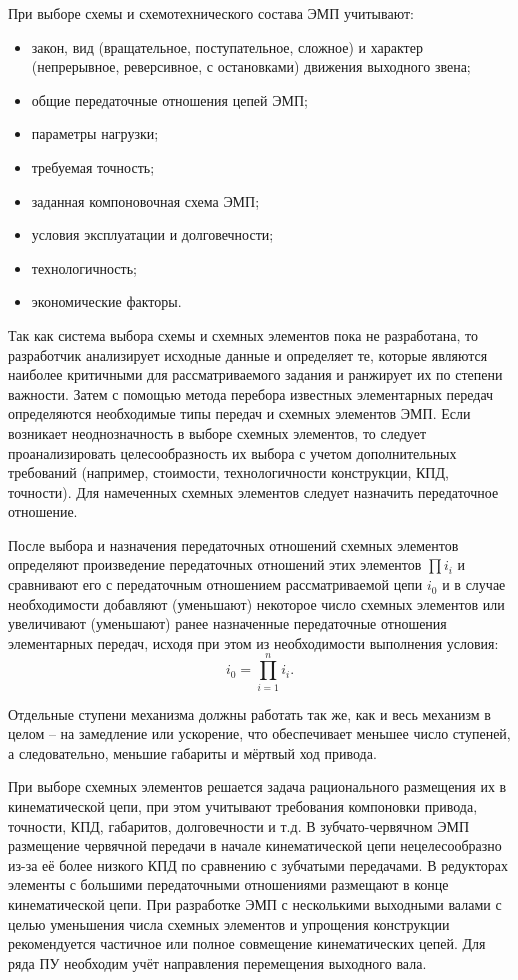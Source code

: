 При выборе схемы и схемотехнического состава ЭМП учитывают: 
\begin{itemize}
	\item закон, вид (вращательное, поступательное, сложное) и характер (непрерывное, реверсивное, с остановками) движения выходного звена;
	\item общие передаточные отношения цепей ЭМП;
	\item параметры нагрузки;
	\item требуемая точность;
	\item заданная компоновочная схема ЭМП;
	\item условия эксплуатации и долговечности;
	\item технологичность;
	\item экономические факторы.
\end{itemize}

Так как система выбора схемы и схемных элементов пока не разработана, то разработчик анализирует исходные данные и определяет те, которые являются наиболее критичными для рассматриваемого задания и ранжирует их по степени важности.
Затем с помощью метода перебора известных элементарных передач определяются необходимые типы передач и схемных элементов ЭМП.
Если возникает неоднозначность в выборе схемных элементов, то следует проанализировать целесообразность их выбора с учетом дополнительных требований (например, стоимости, технологичности конструкции, КПД, точности). 
Для намеченных схемных элементов следует назначить передаточное отношение.

После выбора и назначения передаточных отношений схемных элементов определяют произведение передаточных отношений этих элементов $ \prod{i_i} $ и сравнивают его с передаточным отношением рассматриваемой цепи $ i_0 $ и в случае необходимости добавляют (уменьшают) некоторое число схемных элементов или увеличивают (уменьшают) ранее назначенные передаточные отношения элементарных передач, исходя при этом из необходимости выполнения условия:
\begin{equation*}
i_0 = \prod_{i=1}^{n}i_i.
\end{equation*}

Отдельные ступени механизма должны работать так же, как и весь механизм в целом -- на замедление или ускорение, что обеспечивает меньшее число ступеней, а следовательно, меньшие габариты и мёртвый ход привода.

При выборе схемных элементов решается задача рационального размещения их в кинематической цепи, при этом учитывают требования компоновки привода, точности, КПД, габаритов, долговечности и т.д. 
В зубчато-червячном ЭМП размещение червячной передачи в начале кинематической цепи нецелесообразно из-за её более низкого КПД по сравнению с зубчатыми передачами. 
В редукторах элементы с большими передаточными отношениями размещают в конце кинематической цепи. При разработке ЭМП с несколькими выходными валами с целью уменьшения числа схемных элементов и упрощения конструкции рекомендуется частичное или полное совмещение кинематических цепей. Для ряда ПУ необходим учёт направления перемещения выходного вала.